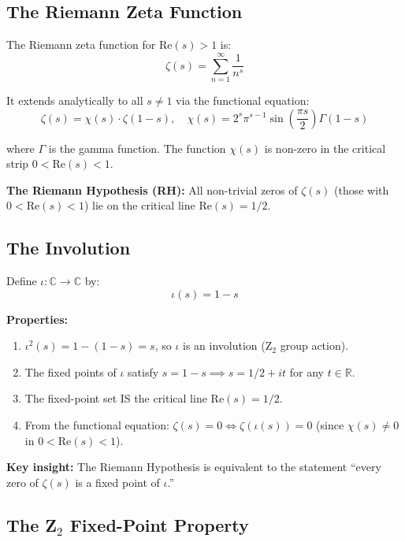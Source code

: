 \documentclass[11pt]{article}
\begin{document}
\subsection{The Riemann Zeta Function}

The Riemann zeta function for $\mathrm{Re}(s) > 1$ is:
$$\zeta(s) = \sum_{n=1}^{\infty} \frac{1}{n^s}$$

It extends analytically to all $s \neq 1$ via the functional equation:
\begin{equation}\label{eq:functional}
\zeta(s) = \chi(s) \cdot \zeta(1-s), \quad \chi(s) = 2^s \pi^{s-1} \sin\left(\frac{\pi s}{2}\right) \Gamma(1-s)
\end{equation}

where $\Gamma$ is the gamma function. The function $\chi(s)$ is non-zero in the critical strip $0 < \mathrm{Re}(s) < 1$.

\textbf{The Riemann Hypothesis (RH):} All non-trivial zeros of $\zeta(s)$ (those with $0 < \mathrm{Re}(s) < 1$) lie on the critical line $\mathrm{Re}(s) = 1/2$.

\subsection{The Involution}

Define $\iota: \mathbb{C} \to \mathbb{C}$ by:
\begin{equation}
\iota(s) = 1 - s
\end{equation}

\textbf{Properties:}
\begin{enumerate}[nosep]
\item $\iota^2(s) = 1 - (1 - s) = s$, so $\iota$ is an involution (Z$_2$ group action).
\item The fixed points of $\iota$ satisfy $s = 1 - s \implies s = 1/2 + it$ for any $t \in \mathbb{R}$.
\item The fixed-point set IS the critical line $\mathrm{Re}(s) = 1/2$.
\item From the functional equation: $\zeta(s) = 0 \iff \zeta(\iota(s)) = 0$ (since $\chi(s) \neq 0$ in $0 < \mathrm{Re}(s) < 1$).
\end{enumerate}

\textbf{Key insight:} The Riemann Hypothesis is equivalent to the statement ``every zero of $\zeta(s)$ is a fixed point of $\iota$.''

\subsection{The Z$_2$ Fixed-Point Property}
\end{document}

